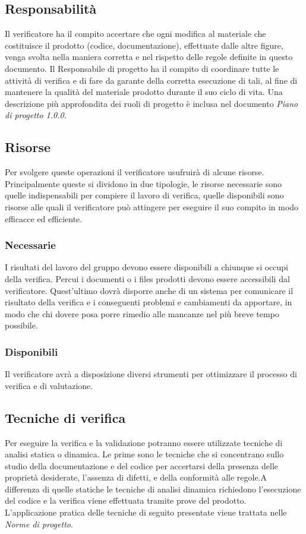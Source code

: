 \subsection{Responsabilità}
Il verificatore ha il compito accertare che ogni modifica al materiale che costituisce il prodotto (codice, documentazione), effettuate dalle altre figure, venga svolta nella maniera corretta e nel rispetto delle regole definite in questo documento. Il Responsabile di progetto ha il compito di coordinare tutte le attività di verifica e di fare da garante della corretta esecuzione di tali, al fine di mantenere la qualità del materiale prodotto durante il suo ciclo di vita. Una descrizione più approfondita dei ruoli di progetto è inclusa nel documento  \textit{Piano di progetto 1.0.0}.

\subsection{Risorse}
Per svolgere queste operazioni il verificatore usufruirà di alcune risorse. Principalmente queste si dividono in due tipologie, le risorse necessarie sono quelle indispensabili per compiere il lavoro di verifica, quelle disponibili sono risorse alle quali il verificatore può attingere per eseguire il suo compito in modo efficacce ed efficiente.

\subsubsection{Necessarie}
I risultati del lavoro del gruppo devono essere disponibili a chiunque si occupi della verifica. Percui i documenti o i files prodotti devono essere accessibili dal verificatore. Quest'ultimo dovrà disporre anche di un sistema per comunicare il risultato della verifica e i conseguenti problemi e cambiamenti da apportare, in modo che chi dovere posa porre rimedio alle mancanze nel più breve tempo possibile.

\subsubsection{Disponibili}
Il verificatore avrà a disposizione diversi strumenti per ottimizzare il processo di verifica e di valutazione. 

\subsection{Tecniche di verifica}
Per eseguire la verifica e la validazione potranno essere utilizzate tecniche di analisi statica o dinamica. Le prime sono le tecniche che si concentrano sullo studio della documentazione e del codice per accertarsi della presenza delle proprietà desiderate, l'assenza di difetti, e della conformità alle regole.A differenza di quelle statiche le tecniche di analisi dinamica richiedono l'esecuzione del codice e la verifica viene effettuata tramite prove del prodotto.\\
L'applicazione pratica delle tecniche di seguito presentate viene trattata nelle \textit{Norme di progetto}.
